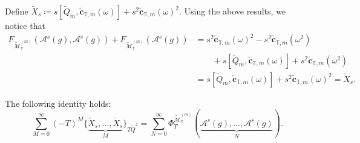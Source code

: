 \documentclass[a4paper, english, 12pt, bibliography=totocnumbered,
index=totoc]{scrartcl}
\begin{document}
Define $\tilde{X}_s \coloneqq s[\tilde{Q}_m, \tilde{\mathbf{c}}_{\mathbb{T},
	m}(\omega)] + s^2\tilde{\mathbf{c}}_{\mathbb{T}, m}(\omega)^2$.
Using the above results, we notice that
\begin{align*}
	F_{\tilde{\mathscr{M}}_{\mathbb{T}}^{(m)}}(\mathcal{A}^s(g),
	\mathcal{A}^s(g)) +
	F_{\tilde{\mathscr{M}}_{\mathbb{T}}^{(m)}}(\mathcal{A}^s(g)) & = s^2
	\tilde{\mathbf{c}}_{\mathbb{T}, m}(\omega)^2 -
	s^2\tilde{\mathbf{c}}_{\mathbb{T}, m}(\omega^2) \\
	& \qquad + s[\tilde{Q}_m, \tilde{\mathbf{c}}_{\mathbb{T}, m}(\omega)] +
	s^2\tilde{\mathbf{c}}_{\mathbb{T}, m}(\omega^2) \\
	& = s[\tilde{Q}_m,
	\tilde{\mathbf{c}}_{\mathbb{T}, m}(\omega)] + s^2
	\tilde{\mathbf{c}}_{\mathbb{T}, m}(\omega)^2 =
	\tilde{X}_s.
\end{align*}
\begin{lem}
	The following identity holds:
	\begin{equation*}
		\sum_{M = 0}^{\infty} (-T)^M \{\underbrace{\tilde{X}_s, \ldots,
			\tilde{X}_s}_M\}_{T\tilde{Q}^2} = \sum_{N=0}^{\infty}
		\Phi_T^{\tilde{\mathscr{M}}_{\mathbb{T}}^{(m)}}
		(\underbrace{\mathcal{A}^s(g),
			\ldots, \mathcal{A}^s(g)}_N).
	\end{equation*}
\end{lem}
\end{document}

